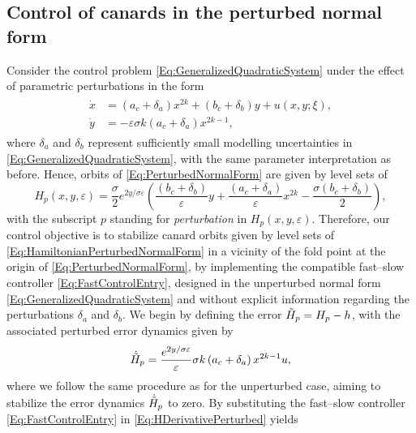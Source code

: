 \documentclass[3p]{elsarticle}
\theoremstyle{plain}
\theoremstyle{remark}
\theoremstyle{definition}
\begin{document}
\subsection{Control of canards in the perturbed normal form}
    \label{SubSec:PerturbationNormalForm}
    Consider the control problem \eqref{Eq:GeneralizedQuadraticSystem} under the effect of parametric perturbations in the form
    \begin{align}
        \begin{split}
            \dot{x} &= \left(a_{c} + \delta_{a}\right)x^{2k} + \left( b_{c} + \delta_{b} \right)y + u(x,y;\xi),\\
            \dot{y} &= -\varepsilon \sigma k\left(a_{c} + \delta_{a}\right)x^{2k-1},
            \label{Eq:PerturbedNormalForm}
        \end{split}
    \end{align}
    where $\delta_{a}$ and $\delta_{b}$ represent sufficiently small modelling uncertainties in \eqref{Eq:GeneralizedQuadraticSystem}, with the same parameter interpretation as before. Hence, orbits of \eqref{Eq:PerturbedNormalForm} are given by level sets of
    \begin{equation}
        H_{p}\left( x, y, \varepsilon \right) = \frac{\sigma}{2}e^{2y/\sigma \varepsilon}\left( \frac{\left(b_{c}+\delta_{b}\right)}{\varepsilon}y + \frac{\left(a_{c}+\delta_{a}\right)}{\varepsilon}x^{2k} - \frac{\sigma \left(b_{c}+\delta_{b}\right)}{2}
            \right),
        \label{Eq:HamiltonianPerturbedNormalForm}
    \end{equation}
    with the subscript $p$ standing for \emph{perturbation} in $H_{p}(x,y,\varepsilon)$. Therefore, our control objective is to stabilize canard orbits given by level sets of \eqref{Eq:HamiltonianPerturbedNormalForm} in a vicinity of the fold point at the origin of \eqref{Eq:PerturbedNormalForm}, by implementing the compatible fast--slow controller \eqref{Eq:FastControlEntry}, designed in the unperturbed normal form \eqref{Eq:GeneralizedQuadraticSystem} and without explicit information regarding the perturbations $\delta_{a}$ and $\delta_{b}$. We begin by defining the error $\Tilde{H}_{p} = H_{p} - h$, with the associated perturbed error dynamics given by
    \begin{equation}
        \dot{\Tilde{H}}_{p} = \frac{e^{2y/\sigma \varepsilon}}{\varepsilon} \sigma k \left( a_{c} + \delta_{a} \right)x^{2k-1}u, 
        \label{Eq:HDerivativePerturbed}
    \end{equation}
    where we follow the same procedure as for the unperturbed case, aiming to stabilize the error dynamics $\dot{\Tilde{H}}_{p}$ to zero. By substituting the fast--slow controller \eqref{Eq:FastControlEntry} in \eqref{Eq:HDerivativePerturbed} yields
\end{document}
